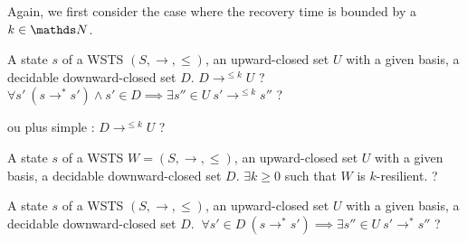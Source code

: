 
%
%

Again, we first consider the case where the recovery time is bounded by a $k \in \N$.

{A state $s$ of a WSTS $(S,\rightarrow, \leq)$, an upward-closed set $U$ with a given basis, a decidable downward-closed set $D$.}
{$D \longrightarrow^{\leq k} U$ ?\newline}
%
{$\forall s' ~ (s \rightarrow^* s') \wedge s' \in D  \implies \exists s'' \in U ~ s' \rightarrow^{\leq k} s''$ ?\newline}
%


ou plus simple : $D \rightarrow^{\leq k} U$ ? 



{A state $s$ of a WSTS $W=(S,\rightarrow, \leq)$, an upward-closed set $U$ with a given basis, a decidable downward-closed set $D$.}
{$\exists k \geq 0$ such that $W$ is $k$-resilient. ?\newline}

{A state $s$ of a WSTS $(S,\rightarrow, \leq)$, an upward-closed set $U$ with a given basis, a decidable downward-closed set $D$.}
{$ ~ \forall s' \in D ~ (s \rightarrow^* s') \implies \exists s'' \in U ~ s' \rightarrow^{*} s''$ ?\newline}

